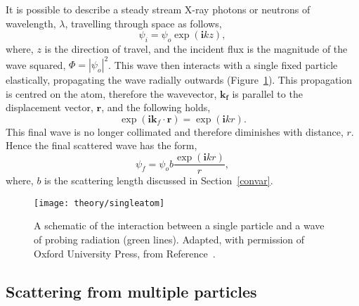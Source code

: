 It is possible to describe a steady stream X-ray photons or neutrons of wavelength, $\lambda$, travelling through space as follows,
%
\begin{equation}
    \psi_i = \psi_o \exp{(\mathbf{i} kz)},
    \label{equ:wave}
\end{equation}
%
where, $z$ is the direction of travel, and the incident flux is the magnitude of the wave squared, $\Phi = |\psi_o|^2$.
This wave then interacts with a single fixed particle elastically, propagating the wave radially outwards (Figure~\ref{fig:singleatom}).
This propagation is centred on the atom, therefore the wavevector, $\mathbf{k_f}$ is parallel to the displacement vector, $\mathbf{r}$, and the following holds,
%
\begin{equation}
    \exp{(\mathbf{i}\mathbf{k}_f\cdot \mathbf{r})} = \exp{(\mathbf{i}kr)}.
\end{equation}
%
This final wave is no longer collimated and therefore diminishes with distance, $r$.
Hence the final scattered wave has the form,
%
\begin{equation}
    \psi_f = \psi_o b\frac{\exp{(\mathbf{i}kr)}}{r},
\end{equation}
%
where, $b$ is the scattering length discussed in Section~\ref{convar}.
%
\begin{figure}
    \centering
    \texttt{[image: theory/singleatom]}
    \caption{A schematic of the interaction between a single particle and a wave of probing radiation (green lines). Adapted, with permission of Oxford University Press\textsuperscript{\textcopyright}, from Reference~\cite{sivia_elementary_2011}.}
    \label{fig:singleatom}
\end{figure}
%

\subsection{Scattering from multiple particles}
\label{sec:multiscat}

